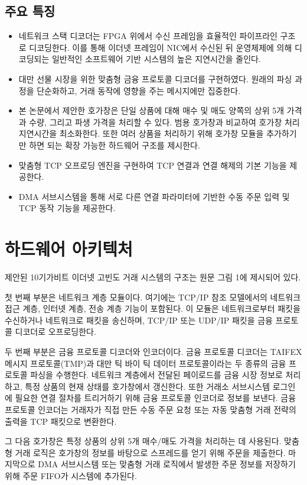 \documentclass[11pt,a4paper]{article}
\begin{document}
\subsection{주요 특징}
\begin{itemize}
    \item 네트워크 스택 디코더는 FPGA 위에서 수신 프레임을 효율적인 파이프라인 구조로 디코딩한다. 이를 통해 이더넷 프레임이 NIC에서 수신된 뒤 운영체제에 의해 디코딩되는 일반적인 소프트웨어 기반 시스템의 높은 지연시간을 줄인다.
    \item 대만 선물 시장을 위한 맞춤형 금융 프로토콜 디코더를 구현하였다. 원래의 파싱 과정을 단순화하고, 거래 동작에 영향을 주는 메시지에만 집중한다.
    \item 본 논문에서 제안한 호가창은 단일 상품에 대해 매수 및 매도 양쪽의 상위 5개 가격과 수량, 그리고 파생 가격을 처리할 수 있다. 범용 호가창과 비교하여 호가창 처리 지연시간을 최소화한다. 또한 여러 상품을 처리하기 위해 호가창 모듈을 추가하기만 하면 되는 확장 가능한 하드웨어 구조를 제시한다.
    \item 맞춤형 TCP 오프로딩 엔진을 구현하여 TCP 연결과 연결 해제의 기본 기능을 제공한다.
    \item DMA 서브시스템을 통해 서로 다른 연결 파라미터에 기반한 수동 주문 입력 및 TCP 동작 기능을 제공한다.
\end{itemize}

\section{하드웨어 아키텍처}
제안된 10기가비트 이더넷 고빈도 거래 시스템의 구조는 원문 그림 1에 제시되어 있다.

첫 번째 부분은 네트워크 계층 모듈이다. 여기에는 TCP/IP 참조 모델에서의 네트워크 접근 계층, 인터넷 계층, 전송 계층 기능이 포함된다. 이 모듈은 네트워크로부터 패킷을 수신하거나 네트워크로 패킷을 송신하며, TCP/IP 또는 UDP/IP 패킷을 금융 프로토콜 디코더로 오프로딩한다.

두 번째 부분은 금융 프로토콜 디코더와 인코더이다. 금융 프로토콜 디코더는 TAIFEX 메시지 프로토콜(TMP)과 대만 틱 바이 틱 데이터 프로토콜이라는 두 종류의 금융 프로토콜 파싱을 수행한다. 네트워크 계층에서 전달된 페이로드를 금융 시장 정보로 처리하고, 특정 상품의 현재 상태를 호가창에서 갱신한다. 또한 거래소 서브시스템 로그인에 필요한 연결 절차를 트리거하기 위해 금융 프로토콜 인코더로 정보를 보낸다. 금융 프로토콜 인코더는 거래자가 직접 만든 수동 주문 요청 또는 자동 맞춤형 거래 전략의 출력을 TCP 패킷으로 변환한다.

그 다음 호가창은 특정 상품의 상위 5개 매수/매도 가격을 처리하는 데 사용된다. 맞춤형 거래 로직은 호가창의 정보를 바탕으로 스프레드를 얻기 위해 주문을 제출한다. 마지막으로 DMA 서브시스템 또는 맞춤형 거래 로직에서 발생한 주문 정보를 저장하기 위해 주문 FIFO가 시스템에 추가된다.
\end{document}
